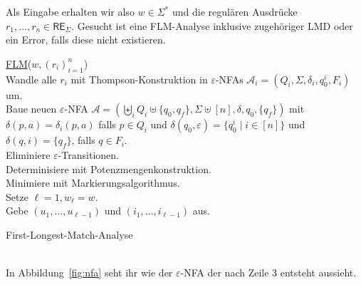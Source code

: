 \documentclass[11pt, a4paper]{article}
\theoremstyle{definition}
\theoremstyle{plain}
\numberwithin{equation}{section}
\begin{document}
Als Eingabe erhalten wir also \( w \in \Sigma^\ast \) und die regulären Ausdrücke \( r_1, \ldots, r_n \in \mathsf{RE}_\Sigma \). Gesucht ist eine FLM-Analyse inklusive zugehöriger LMD oder ein Error, falls diese nicht existieren.
\begin{algorithm}
	\underline{FLM}{($w, (r_i)_{i=1}^n$)}\\
	Wandle alle \( r_i \) mit Thompson-Konstruktion in \(\varepsilon\)-NFAs \( \mathcal{A}_i = (Q_i, \Sigma, \delta_i, q_0^i, F_i) \) um.\\
	Baue neuen $\varepsilon$-NFA $\mathcal{A} = (\biguplus_i Q_i \uplus \{q_0, q_f\}, \Sigma \uplus [n], \delta, q_0, \{q_f\})$ mit $\delta(p, a) = \delta_i(p, a)$ falls $p \in Q_i$ und $\delta(q_0, \varepsilon) = \{q_0^i \mid i \in [n]\}$ und $\delta(q, i) = \{q_f\}$, falls $q \in F_i$.\\
	Eliminiere $\varepsilon$-Transitionen.\\
	Determinisiere mit Potenzmengenkonstruktion.\\
	Minimiere mit Markierungsalgorithmus.\\
	Setze $\ell = 1, w_\ell = w$.\\
	Gebe $(u_1, \ldots, u_{\ell-1})$ und $(i_1, \ldots, i_{\ell-1})$ aus.
	\caption{First-Longest-Match-Analyse}
	\label{alg:algorithm}
\end{algorithm}\\
In Abbildung~\ref{fig:nfa} seht ihr wie der \(\varepsilon\)-NFA der nach Zeile 3 entsteht aussieht.
\end{document}
